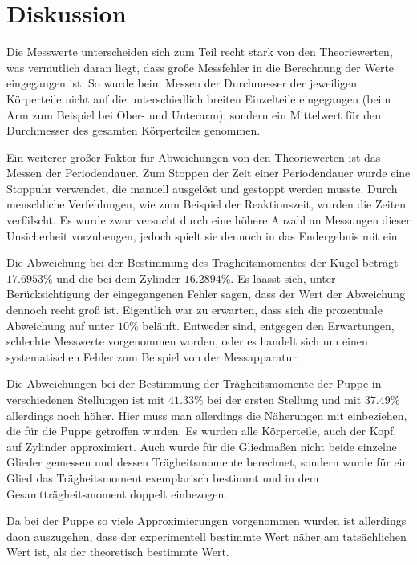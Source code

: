 \newpage
\section{Diskussion}
\label{sec:Diskussion}


Die Messwerte unterscheiden sich zum Teil recht stark von den Theoriewerten, was vermutlich daran liegt, dass große Messfehler
in die Berechnung der Werte eingegangen ist. So wurde beim Messen der Durchmesser der jeweiligen Körperteile nicht auf die unterschiedlich
breiten Einzelteile eingegangen (beim Arm zum Beispiel bei Ober- und Unterarm), sondern ein Mittelwert für den Durchmesser des gesamten
Körperteiles genommen.

Ein weiterer großer Faktor für Abweichungen von den Theoriewerten ist das Messen der Periodendauer. Zum Stoppen der Zeit einer 
Periodendauer wurde eine Stoppuhr verwendet, die manuell ausgelöst und gestoppt werden musste. Durch menschliche Verfehlungen, wie zum Beispiel
der Reaktionszeit, wurden die Zeiten verfälscht. Es wurde zwar versucht durch eine höhere Anzahl an Messungen dieser Unsicherheit vorzubeugen, jedoch
spielt sie dennoch in das Endergebnis mit ein. 

Die Abweichung bei der Bestimmung des Trägheitsmomentes der Kugel beträgt $17.6953 \%$ und die bei dem Zylinder $16.2894 \%$. Es läasst sich,
unter Berücksichtigung der eingegangenen Fehler sagen, dass der Wert der Abweichung dennoch recht groß ist. Eigentlich war zu erwarten, dass sich die
prozentuale Abweichung auf unter $10 \%$ beläuft. Entweder sind, entgegen den Erwartungen, schlechte Messwerte vorgenommen worden, oder es handelt
sich um einen systematischen Fehler zum Beispiel von der Messapparatur.

Die Abweichungen bei der Bestimmung der Trägheitsmomente der Puppe in verschiedenen Stellungen ist mit $41.33 \%$ bei der ersten Stellung und mit
$37.49 \%$ allerdings noch höher. Hier muss man allerdings die Näherungen mit einbeziehen, die für die Puppe getroffen wurden. Es wurden alle
Körperteile, auch der Kopf, auf Zylinder approximiert. Auch wurde für die Gliedmaßen nicht beide einzelne Glieder gemessen und dessen Trägheitsmomente
berechnet, sondern wurde für ein Glied das Trägheitsmoment exemplarisch bestimmt und in dem Gesamtträgheitsmoment doppelt einbezogen.

Da bei der Puppe so viele Approximierungen vorgenommen wurden ist allerdings daon auszugehen, dass der experimentell bestimmte Wert näher am 
tatsächlichen Wert ist, als der theoretisch bestimmte Wert.